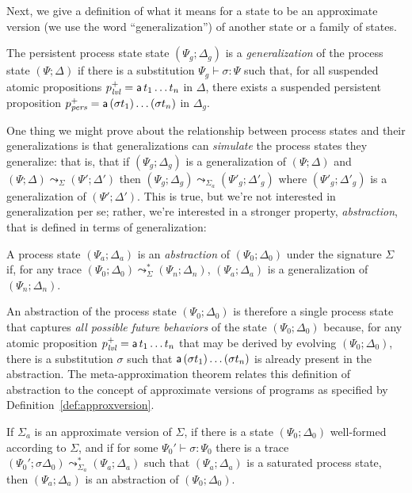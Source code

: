 Next, we give a definition of what it means for a state to be an 
approximate version (we use the word ``generalization'') of another state
or a family of states. 

\bigskip
\begin{definition}
  The persistent process state state $(\Psi_g; \Delta_g)$ is a {\em
    generalization} of the process state $(\Psi; \Delta)$ if there is
  a substitution $\Psi_g \vdash \sigma : \Psi$ such that, for all
  suspended atomic propositions $p^+_{\it lvl} = {\sf a}\,t_1\ldots t_n$
  in $\Delta$, there exists a suspended persistent proposition
  $p^+_{\it pers} = {\sf a}\,(\sigma t_1)\ldots(\sigma t_n)$ in
  $\Delta_g$.
\end{definition}
\bigskip

One thing we might prove about the relationship between process states
and their generalizations is that generalizations can {\it simulate}
the process states they generalize: that is, that if $(\Psi_g;
\Delta_g)$ is a generalization of $(\Psi; \Delta)$ and $(\Psi; \Delta)
\leadsto_\Sigma (\Psi'; \Delta')$ then $(\Psi_g; \Delta_g)
\leadsto_{\Sigma_a} (\Psi'_g; \Delta'_g)$ where $(\Psi'_g; \Delta'_g)$
is a generalization of $(\Psi'; \Delta')$. This is true, but we're not
interested in generalization per se; rather, we're interested in a
stronger property, {\em abstraction}, that is defined in terms of
generalization:

\bigskip
\begin{definition}
A process state $(\Psi_a; \Delta_a)$ is an {\em abstraction} of 
$(\Psi_0; \Delta_0)$ under the signature $\Sigma$ if, for any trace
$(\Psi_0; \Delta_0) \leadsto^*_\Sigma (\Psi_n; \Delta_n)$, 
$(\Psi_a; \Delta_a)$ is a generalization of $(\Psi_n; \Delta_n)$. 
\end{definition}
\bigskip

An abstraction of the process state $(\Psi_0; \Delta_0)$ is therefore
a single process state that captures {\it all possible future
  behaviors} of the state $(\Psi_0; \Delta_0)$ because, for any atomic
proposition $p^+_{\it lvl} = {\sf a}\,t_1\ldots t_n$ that may be derived
by evolving $(\Psi_0; \Delta_0)$, there is a substitution $\sigma$
such that ${\sf a}\,(\sigma t_1)\ldots(\sigma t_n)$ is already present
in the abstraction. The meta-approximation theorem relates this definition
of abstraction to the concept of approximate versions of programs as
specified by Definition~\ref{def:approxversion}.  

\bigskip
\begin{theorem}\label{thm:metapprox}
  If $\Sigma_a$ is an approximate version of $\Sigma$, if there is a
  state $(\Psi_0; \Delta_0)$ well-formed according to $\Sigma$, and if
  for some $\Psi_0' \vdash \sigma : \Psi_0$ there is a trace
  $(\Psi_0'; \sigma\Delta_0) \leadsto^*_{\Sigma_a} (\Psi_a; \Delta_a)$
  such that $(\Psi_a; \Delta_a)$ is a saturated process state, then
  $(\Psi_a; \Delta_a)$ is an abstraction of $(\Psi_0; \Delta_0)$.
\end{theorem}

